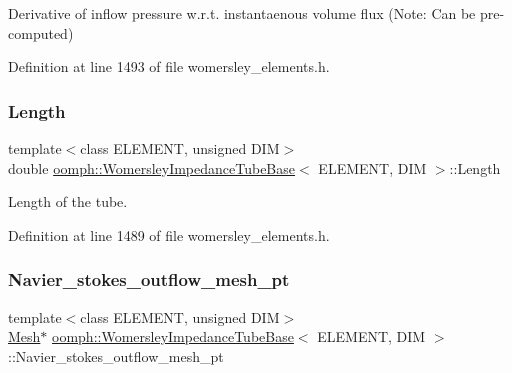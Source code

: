 Derivative of inflow pressure w.\+r.\+t. instantaenous volume flux (Note\+: Can be pre-\/computed) 



Definition at line 1493 of file womersley\+\_\+elements.\+h.

\mbox{\label{classoomph_1_1WomersleyImpedanceTubeBase_a3be3a17477e68ee912699b1cc8749ee7}} 
\subsubsection{\texorpdfstring{Length}{Length}}
{\footnotesize\ttfamily template$<$class E\+L\+E\+M\+E\+NT, unsigned D\+IM$>$ \\
double \hyperlink{classoomph_1_1WomersleyImpedanceTubeBase}{oomph\+::\+Womersley\+Impedance\+Tube\+Base}$<$ E\+L\+E\+M\+E\+NT, D\+IM $>$\+::Length\hspace{0.3cm}{\ttfamily [protected]}}



Length of the tube. 



Definition at line 1489 of file womersley\+\_\+elements.\+h.

\mbox{\label{classoomph_1_1WomersleyImpedanceTubeBase_a59b41acf37d7bfce3c1a8676304915d7}} 
\subsubsection{\texorpdfstring{Navier\+\_\+stokes\+\_\+outflow\+\_\+mesh\+\_\+pt}{Navier\_stokes\_outflow\_mesh\_pt}}
{\footnotesize\ttfamily template$<$class E\+L\+E\+M\+E\+NT, unsigned D\+IM$>$ \\
\hyperlink{classoomph_1_1Mesh}{Mesh}$\ast$ \hyperlink{classoomph_1_1WomersleyImpedanceTubeBase}{oomph\+::\+Womersley\+Impedance\+Tube\+Base}$<$ E\+L\+E\+M\+E\+NT, D\+IM $>$\+::Navier\+\_\+stokes\+\_\+outflow\+\_\+mesh\+\_\+pt\hspace{0.3cm}{\ttfamily [protected]}}



